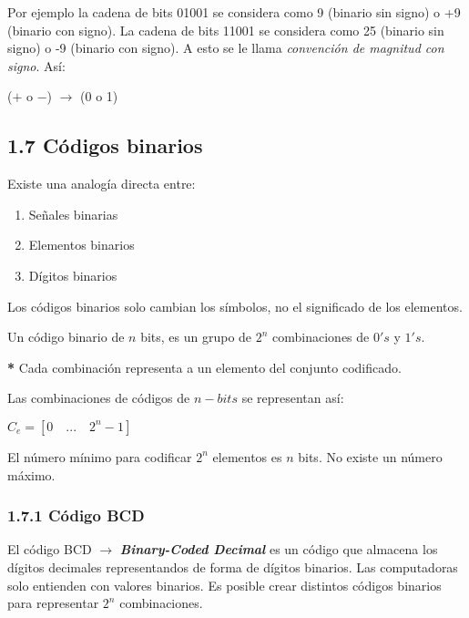 \documentclass{article}
\begin{document}
Por ejemplo la cadena de bits 01001 se considera como 9 (binario sin signo) o +9 (binario
con signo). La cadena de bits 11001 se considera como 25 (binario sin signo) o -9 (binario
con signo). A esto se le llama \textit{convenci\'{o}n de magnitud con signo}. As\'{i}:
\begin{center}
    ($+$ o $-$) $\rightarrow$ (0 o 1)
\end{center}

\subsection*{1.7 C\'{o}digos binarios}

Existe una analog\'{i}a directa entre:
\begin{enumerate}
    \small
    \item Se\~{n}ales binarias
    \item Elementos binarios
    \item D\'{i}gitos binarios
\end{enumerate}

Los c\'{o}digos binarios solo cambian los s\'{i}mbolos, no el significado de los elementos.
\begin{center}
    Un c\'{o}digo binario de $n$ bits, es un grupo de $2^n$ combinaciones de $0's$ y $1's$.
    
    \textbf{*} Cada combinaci\'{o}n representa a un elemento del conjunto codificado.    
\end{center}

Las combinaciones de c\'{o}digos de $n-bits$ se representan as\'{i}:
\begin{center}
    $ C_{e} = [0 \quad ... \quad 2^n - 1]$
\end{center}

El n\'{u}mero m\'{i}nimo para codificar $2^n$ elementos es $n$ bits. No existe un n\'{u}mero 
m\'{a}ximo.

\subsubsection*{1.7.1 C\'{o}digo BCD}
El c\'{o}digo BCD $\rightarrow$ \textbf{\textit{Binary-Coded Decimal}} es un c\'{o}digo que
almacena los d\'{i}gitos decimales representandos de forma de d\'{i}gitos binarios. Las 
computadoras solo entienden con valores binarios. Es posible crear distintos c\'{o}digos
binarios para representar $2^n$ combinaciones.
\end{document}
